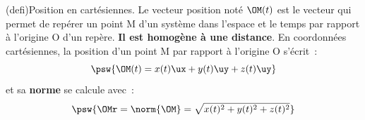 \documentclass[../../main/main.tex]{subfiles}
\begin{document}
\begin{tcb*}[sidebyside, righthand ratio=.29](defi){Position en cartésiennes.}
	Le vecteur position noté $\OM(t)$ est le vecteur qui permet de repérer
	un point M d'un système dans l'espace et le temps par rapport à
	l'origine O d'un repère. \textbf{Il est homogène à une distance}.
	\smallbreak
	En coordonnées cartésiennes, la position d'un point M par rapport à
	l'origine O s'écrit~:
	\[\psw{\OM(t) = x(t)\ux + y(t)\uy + z(t)\uy}\]
	et sa \textbf{norme} se calcule avec~:
	\[\psw{\OMr = \norm{\OM} = \sqrt{x(t)^2 + y(t)^2 + z(t)^2}}\]
	\tcblower
	\begin{center}
\end{center}
\end{tcb*}
\end{document}
